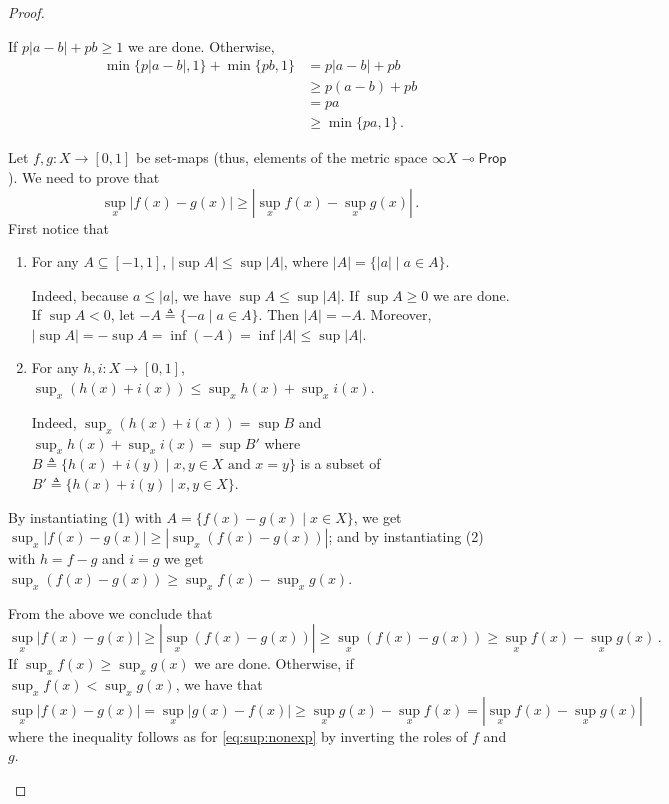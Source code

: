\documentclass[10pt,a4paper]{amsart}
\newcommand{\Prop}{\mathsf{Prop}}
\newcommand{\defeq}{\triangleq}
\newcommand{\lol}{\mathbin{\multimap}}
\newcommand{\mexp}{\lol}
\newcommand{\scaling}{}
\begin{document}
\begin{proof}
\begin{description}[font=\sc,wide]
    If $p|a-b| + pb \geq 1$ we are done. Otherwise,
    \begin{align*}
        \min \{ p|a-b|, 1\} + \min\{pb, 1\}
        &= p|a-b| + pb \\
        &\geq p(a-b) + pb \\
        &= pa \\
        &\geq \min\{pa, 1\} \,.
    \end{align*}
    
    \item[Case $\sup$:]
    Let $f,g \colon X \to [0,1]$ be set-maps (thus, elements of  the metric space $\infty\scaling X \mexp \Prop$). We need to prove that
    \begin{equation*}
        \sup_{x} |f(x)-g(x)| \geq |\sup_x f(x) - \sup_x g(x)| \,.
    \end{equation*}
    First notice that 
    \begin{enumerate}[leftmargin=3\parindent, labelindent=\parindent]
        \item For any $A\subseteq [-1,1]$, $|\sup A| \leq \sup |A|$, where $|A| = \{|a| \mid a \in A\}$. 
        
        Indeed, because $a \leq |a|$, we have $\sup A \leq \sup |A|$. 
        If $\sup A \geq 0$ we are done. 
        If $\sup A < 0$, let $- A \defeq \{ -a \mid a \in A \}$.
        Then $|A| = -A$. Moreover,
        $|\sup A| = - \sup A = \inf(-A) = \inf|A| \leq \sup |A|$.
        \item For any $h,i\colon X \to [0,1]$, $\sup_x (h(x)+i(x)) \leq \sup_x h(x) + \sup_x i(x)$.

        Indeed, $\sup_x (h(x)+i(x)) = \sup B$ and $\sup_x h(x) + \sup_x i(x) = \sup B'$
        where $B \defeq \{h(x)+i(y) \mid x,y\in X \text{ and } x=y \}$ is a subset of $B' \defeq \{h(x)+i(y) \mid x,y\in X \}$.
    \end{enumerate}
    By instantiating (1) with $A = \{f(x) - g(x) \mid x \in X\}$, we get $\sup_x |f(x) - g(x)| \geq |\sup_x (f(x) - g(x))|$; and by instantiating (2) with $h = f-g$ and $i = g$
    we get $\sup_x (f(x)-g(x)) \geq \sup_x f(x) - \sup_x g(x)$.
    
    From the above we conclude that
    \begin{equation} \label{eq:sup:nonexp}
        \sup_{x} |f(x)-g(x)| 
        \geq 
        |\sup_{x} (f(x)-g(x))|
        \geq
        \sup_{x} (f(x)-g(x))
        \geq 
        \sup_x f(x) - \sup_x g(x) \,.
    \end{equation}
    If $\sup_x f(x) \geq \sup_x g(x)$ we are done. Otherwise, if $\sup_x f(x) < \sup_x g(x)$, we have that 
    \begin{equation*}
        \sup_{x} |f(x)-g(x)| 
        = \sup_{x} |g(x)-f(x)|
        \geq \sup_x g(x) - \sup_x f(x) 
        = |\sup_x f(x) - \sup_x g(x)|
    \end{equation*}
    where the inequality follows as for \eqref{eq:sup:nonexp} by inverting the roles of $f$ and $g$.
    

\end{description}
\end{proof}
\end{document}
